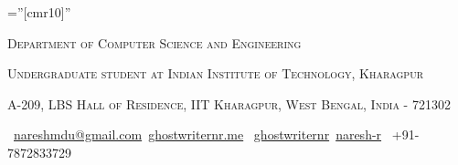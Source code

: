 \documentclass[a4paper,10pt]{extarticle} %
\begin{document}
\pagestyle{empty} %

\font\fb=''[cmr10]'' %


\par{\par} %
\par{\centering\large {\textsc{Department of Computer Science and Engineering}}\par}\large
\par{\centering\large {\textsc{Undergraduate student at Indian Institute of Technology, Kharagpur}}\par}\large
\par{\centering\large {\textsc{A-209, LBS Hall of Residence, IIT Kharagpur, West Bengal, India - 721302}}\par}\large
\hspace{1cm}\normalsize \faEnvelope\ {\href{mailto:nareshmdu@gmail.com}{nareshmdu@gmail.com}}\hfill \normalsize  \faGlobe\ {\href{http://ghostwriternr.me/}{ghostwriternr.me}} \hfill \normalsize \faGithub\ {\href{https://github.com/ghostwriternr}{ghostwriternr}}\hfill \normalsize  \faLinkedinSquare\ {\href{https://www.linkedin.com/in/naresh-r-464a8b8b}{naresh-r}} \hfill {\faPhone\ +91-7872833729} \hspace{1cm}



\end{document}
